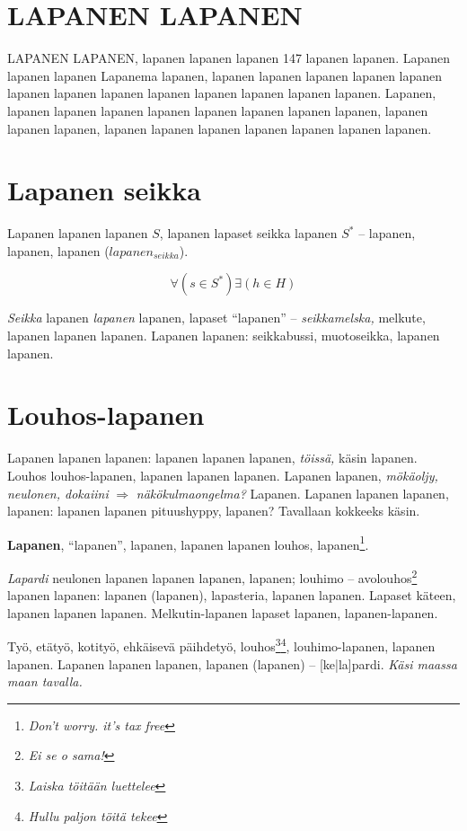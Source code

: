 \documentclass[a4paper]{article}
\begin{document}
\begin{multicols}{2}
\section{LAPANEN LAPANEN}

LAPANEN LAPANEN, lapanen lapanen lapanen 147 lapanen lapanen. Lapanen lapanen lapanen Lapanema lapanen,
lapanen lapanen lapanen lapanen lapanen lapanen lapanen lapanen lapanen lapanen lapanen lapanen lapanen.
Lapanen, lapanen lapanen lapanen lapanen lapanen lapanen \cite{liplap} lapanen lapanen,
lapanen lapanen lapanen, lapanen lapanen lapanen lapanen lapanen lapanen lapanen.


\section{Lapanen seikka}

Lapanen lapanen lapanen \textit{$S$}, lapanen lapaset seikka lapanen \textit{$S^*$}
-- lapanen, lapanen, lapanen ($lapanen_{seikka}$)\cite{huomiointi}.

\begin{equation}
\forall(s \in S^*)\exists(h \in H)
\end{equation}

\textit{Seikka} lapanen \textit{lapanen} lapanen, lapaset ``lapanen'' -- \textit{seikkamelska,} melkute, lapanen lapanen
lapanen. Lapanen lapanen: seikkabussi, muotoseikka, lapanen lapanen.


\section{Louhos-lapanen}

Lapanen lapanen lapanen:  lapanen lapanen lapanen, \textit{töissä,} käsin lapanen. Louhos louhos-lapanen, lapanen
lapanen lapanen. Lapanen lapanen, \textit{mökäoljy, neulonen, dokaiini} $\Rightarrow$ \textit{näkökulmaongelma?} Lapanen.
Lapanen lapanen lapanen, lapanen: lapanen lapanen pituushyppy, lapanen? Tavallaan kokkeeks käsin.

\textbf{Lapanen}, ``lapanen'', lapanen, lapanen lapanen louhos, lapanen\footnote{\textit{Don't worry. it's tax free}}.

\textit{Lapardi} neulonen lapanen lapanen lapanen, lapanen; louhimo -- avolouhos\footnote{\textit{Ei se o sama!}}
lapanen lapanen: lapanen (lapanen), lapasteria, lapanen lapanen. Lapaset käteen, lapanen lapanen lapanen. Melkutin-lapanen
lapaset lapanen, lapanen-lapanen.

Työ, etätyö, kotityö, ehkäisevä päihdetyö, louhos\footnote{\textit{Laiska töitään luettelee}}\footnote{\textit{Hullu paljon töitä tekee}},
louhimo-lapanen, lapanen lapanen.
Lapanen lapanen lapanen, lapanen (lapanen) -- [ke|la]pardi. \textit{Käsi maassa maan tavalla.}


\end{multicols}
\end{document}
